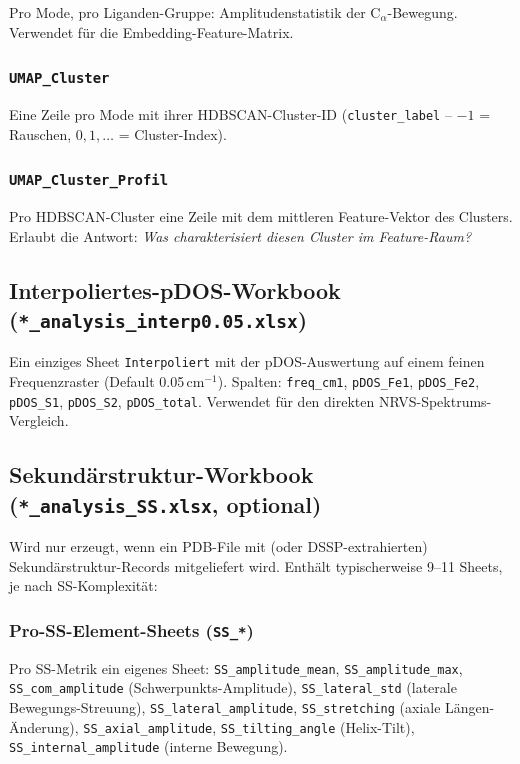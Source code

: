 \documentclass[11pt,a4paper,twoside]{article}
\theoremstyle{remark}
\begin{document}
Pro Mode, pro Liganden-Gruppe: Amplitudenstatistik der
C$_\alpha$-Bewegung. Verwendet f\"ur die Embedding-Feature-Matrix.

\subsubsection*{\texttt{UMAP\_Cluster}}

Eine Zeile pro Mode mit ihrer HDBSCAN-Cluster-ID
(\texttt{cluster\_label} -- $-1$ = Rauschen, $0, 1, \ldots$ =
Cluster-Index).

\subsubsection*{\texttt{UMAP\_Cluster\_Profil}}

Pro HDBSCAN-Cluster eine Zeile mit dem mittleren Feature-Vektor
des Clusters. Erlaubt die Antwort: \emph{Was charakterisiert
diesen Cluster im Feature-Raum?}

\subsection{Interpoliertes-pDOS-Workbook
            (\texttt{*\_analysis\_interp0.05.xlsx})}
\label{app:wb-interp}

Ein einziges Sheet \texttt{Interpoliert} mit der pDOS-Auswertung
auf einem feinen Frequenzraster (Default 0.05\,cm$^{-1}$). Spalten:
\texttt{freq\_cm1}, \texttt{pDOS\_Fe1}, \texttt{pDOS\_Fe2},
\texttt{pDOS\_S1}, \texttt{pDOS\_S2}, \texttt{pDOS\_total}.
Verwendet f\"ur den direkten NRVS-Spektrums-Vergleich.

\subsection{Sekund\"arstruktur-Workbook
            (\texttt{*\_analysis\_SS.xlsx}, optional)}
\label{app:wb-ss}

Wird nur erzeugt, wenn ein PDB-File mit (oder DSSP-extrahierten)
Sekund\"arstruktur-Records mitgeliefert wird. Enth\"alt typischerweise
9--11 Sheets, je nach SS-Komplexit\"at:

\subsubsection*{Pro-SS-Element-Sheets (\texttt{SS\_*})}

Pro SS-Metrik ein eigenes Sheet:
\texttt{SS\_amplitude\_mean},
\texttt{SS\_amplitude\_max},
\texttt{SS\_com\_amplitude} (Schwerpunkts-Amplitude),
\texttt{SS\_lateral\_std} (laterale Bewegungs-Streuung),
\texttt{SS\_lateral\_amplitude},
\texttt{SS\_stretching} (axiale L\"angen-\"Anderung),
\texttt{SS\_axial\_amplitude},
\texttt{SS\_tilting\_angle} (Helix-Tilt),
\texttt{SS\_internal\_amplitude} (interne Bewegung).
\end{document}
